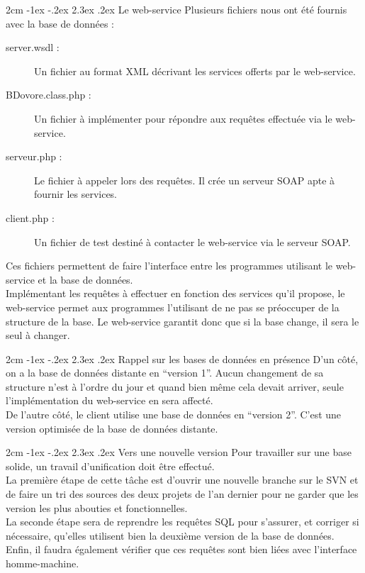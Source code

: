 \documentclass[12pt]{article}
\makeatletter
\renewcommand\section{\@startsection{section}{1}{\z@}%
	{2cm \@plus -1ex \@minus -.2ex}%
	{2.3ex \@plus.2ex}%
	{\reset@font\large\bfseries}}
\makeatother
\begin{document}
\section{Le web-service}
Plusieurs fichiers nous ont été fournis avec la base de données :
\begin{description}
 \item[server.wsdl :] Un fichier au format XML décrivant les services offerts par le web-service.
 \item[BDovore.class.php :] Un fichier à implémenter pour répondre aux requêtes effectuée via le web-service.
 \item[serveur.php :] Le fichier à appeler lors des requêtes. Il crée un serveur SOAP apte à fournir les services.
 \item[client.php :] Un fichier de test destiné à contacter le web-service via le serveur SOAP.
\end{description}
Ces fichiers permettent de faire l'interface entre les programmes utilisant le web-service et la base de données.\\
Implémentant les requêtes à effectuer en fonction des services qu'il propose, le web-service permet aux programmes l'utilisant de ne pas se préoccuper de la structure de la base. Le web-service garantit donc que si la base change, il sera le seul à changer.


\section{Rappel sur les bases de données en présence}
D'un côté, on a la base de données distante en ``version 1''. Aucun changement de sa structure n'est à l'ordre du jour et quand bien même cela devait arriver, seule l'implémentation du web-service en sera affecté.\\
De l'autre côté, le client utilise une base de données en ``version 2''. C'est une version optimisée de la base de données distante.


\section{Vers une nouvelle version}
Pour travailler sur une base solide, un travail d'unification doit être effectué.\\
La première étape de cette tâche est d'ouvrir une nouvelle branche sur le SVN et de faire un tri des sources des deux projets de l'an dernier pour ne garder que les version les plus abouties et fonctionnelles.\\
La seconde étape sera de reprendre les requêtes SQL pour s'assurer, et corriger si nécessaire, qu'elles utilisent bien la deuxième version de la base de données.\\
Enfin, il faudra également vérifier que ces requêtes sont bien liées avec l'interface homme-machine.\\
\end{document}
